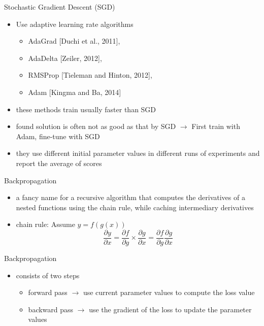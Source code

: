 \begin{frame}{Stochastic Gradient Descent (SGD)}
    \begin{itemize}
        \item<1-> Use adaptive learning rate algorithms 
        \begin{itemize}
            \item<1->  AdaGrad [Duchi et al., 2011], 
            \item<1-> AdaDelta [Zeiler, 2012], 
            \item<1-> RMSProp [Tieleman and Hinton, 2012], 
            \item<1-> Adam [Kingma and Ba, 2014] 
        \end{itemize}
        \item<2-> these methods train usually faster than SGD
        \item<3-> found solution is often not as good as that by SGD $\rightarrow$ First train with Adam, fine-tune with SGD
        \item<4-> they use different initial parameter values in different runs of experiments and report the average of scores
    \end{itemize}
\end{frame}
\begin{frame}{Backpropagation}
\begin{itemize}
    \item<1-> a fancy name for a recursive algorithm that computes the derivatives of a nested functions using the chain rule, while caching intermediary derivatives 
    \item<2-> chain rule: Assume $y = f(g(x))$
    \begin{equation*}
        \frac{\partial y}{\partial x} = \frac{\partial f}{\partial g}\times \frac{\partial g}{\partial x}   = \frac{\partial f}{\partial g}\frac{\partial g}{\partial x}
    \end{equation*}
\end{itemize}
\end{frame}
\begin{frame}{Backpropagation}
\begin{itemize}
    \item<1-> consists of two steps
    \begin{itemize}
        \item<2-> forward pass $\rightarrow$ use current parameter values to compute the loss value
        \item<3-> backward pass $\rightarrow$ use the gradient of the loss to update the parameter values
    \end{itemize}
\end{itemize}
\end{frame}


